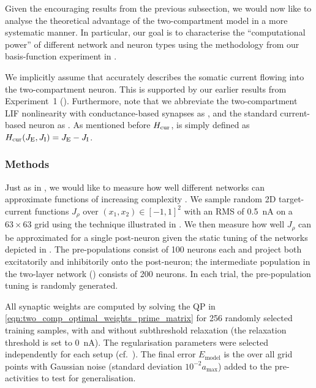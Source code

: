 Given the encouraging results from the previous subsection, we would now like to analyse the theoretical advantage of the two-compartment \LIF model in a more systematic manner.
In particular, our goal is to characterise the \enquote{computational power} of different network and neuron types using the methodology from our basis-function experiment in .

We implicitly assume that \Hcond accurately describes the somatic current flowing into the two-compartment neuron.
This is supported by our earlier results from Experiment~1 ().
Furthermore, note that we abbreviate the two-compartment LIF nonlinearity with conductance-based synapses as \Hcond, and the standard current-based \LIF neuron as \Hcur.
As mentioned before ${H_\mathrm{cur}}$, is simply defined as ${H_\mathrm{cur}}(J_\mathrm{E}, J_\mathrm{I}) = J_\mathrm{E} - J_\mathrm{I}$.

\subsubsection{Methods}
Just as in , we would like to measure how well different networks can approximate functions of increasing complexity \slc.
We sample random 2D target-current functions $J_\rho$ over $(x_1, x_2) \in [-1, 1]^2$ with an RMS of \SI{0.5}{\nano\ampere} on a $63 \times 63$ grid using the technique illustrated in .
We then measure how well $J_\rho$ can be approximated for a single post-neuron given the static tuning of the networks depicted in .
The pre-populations consist of \num{100} neurons each and project both excitatorily and inhibitorily onto the post-neuron; the intermediate population in the two-layer network () consists of \num{200} neurons.
In each trial, the pre-population tuning is randomly generated.

All synaptic weights are computed by solving the QP in \cref{eqn:two_comp_optimal_weights_prime_matrix} for 256 randomly selected training samples, with and without subthreshold relaxation (the relaxation threshold is set to \SI{0}{\nano\ampere}).
The regularisation parameters were selected independently for each setup (cf.~).
The final error $E_\mathrm{model}$ is the \NRMSE over all grid points with Gaussian noise (standard deviation $10^{-2} a_\mathrm{max}$) added to the pre-activities to test for generalisation.


